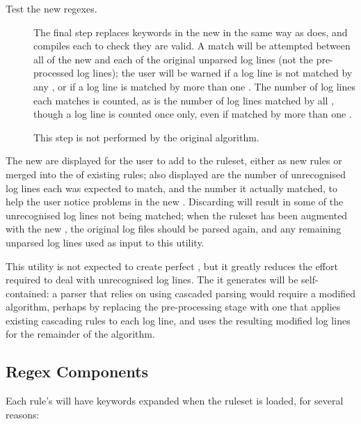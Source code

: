 \begin{description}
    \item [Test the new regexes.]  The final step replaces keywords in the
        new \regexes{} in the same way as \parsername{} does, and compiles
        each  to check they are valid.  A match will be
        attempted between all of the new \regexes{} and each of the
        original unparsed log lines (not the pre-processed log lines); the
        user will be warned if a log line is not matched by any
        , or if a log line is matched by more than one
        .  The number of log lines each 
        matches is counted, as is the number of log lines matched by all
        \regexes{}, though a log line is counted once only, even if matched
        by more than one .

        This step is not performed by the original algorithm.

\end{description}

The new \regexes{} are displayed for the user to add to the ruleset, either
as new rules or merged into the \regexes{} of existing rules; also
displayed are the number of unrecognised log lines each  was
expected to match, and the number it actually matched, to help the user
notice problems in the new \regexes{}.  Discarding \regexes{} will result
in some of the unrecognised log lines not being matched; when the ruleset
has been augmented with the new \regexes{}, the original log files should
be parsed again, and any remaining unparsed log lines used as input to this
utility.

This utility is not expected to create perfect \regexes{}, but it greatly
reduces the effort required to deal with unrecognised log lines.  The
\regexes{} it generates will be self-contained: a parser that relies on
using cascaded parsing would require a modified algorithm, perhaps by
replacing the pre-processing stage with one that applies existing cascading
rules to each log line, and uses the resulting modified log lines for the
remainder of the algorithm.

\subsection{Regex Components}

\label{regex components}

Each rule's  will have keywords expanded when the ruleset is
loaded, for several reasons:

